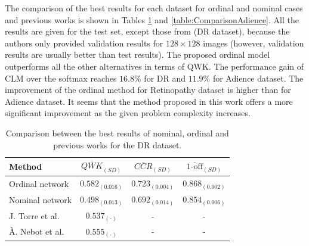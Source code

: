 \documentclass[journal]{IEEEtran}
\begin{document}
	The comparison of the best results for each dataset for ordinal and nominal cases and previous works is shown in Tables \ref{table:ComparisonDR} and \ref{table:ComparisonAdience}. All the results are given for the test set, except those from \cite{de2018weighted} (DR dataset), because the authors only provided validation results for $128\times 128$ images (however, validation results are usually better than test results). The proposed ordinal model outperforms all the other alternatives in terms of QWK. The performance gain of CLM over the softmax reaches $16.8\%$ for DR and $11.9\%$ for Adience dataset. The improvement of the ordinal method for Retinopathy dataset is higher than for Adience dataset. It seems that the method proposed in this work offers a more significant improvement as the given problem complexity increases.
	
	\begin{table}[!t]
		\caption{Comparison between the best results of nominal, ordinal and previous works for the DR dataset.}
		\label{table:ComparisonDR}
		\scriptsize
		\centering
		\def\arraystretch{1.3}
		\begin{tabular}{lccc}
			\hline
			\hline
			Method                                   & $\overline{QWK}_{(SD)}$ & $\overline{CCR}_{(SD)}$ & $\overline{\text{1-off}}_{(SD)}$ \\ \hline
			Ordinal network                          &    $0.582_{(0.016)}$    &    $0.723_{(0.004)}$    &        $0.868_{(0.002)}$         \\
			Nominal network                          &    $0.498_{(0.013)}$    &    $0.692_{(0.014)}$    &        $0.854_{(0.006)}$         \\
			J. Torre et al. \cite{de2018weighted}    &  $0.537_{(\text{-})}$   &            -            &                -                 \\
			À. Nebot et al. \cite{nebot2016diabetic} &  $0.555_{(\text{-})}$   &            -            &                -					\\
			\hline
			\hline
		\end{tabular}
	\end{table}
	
\end{document}
